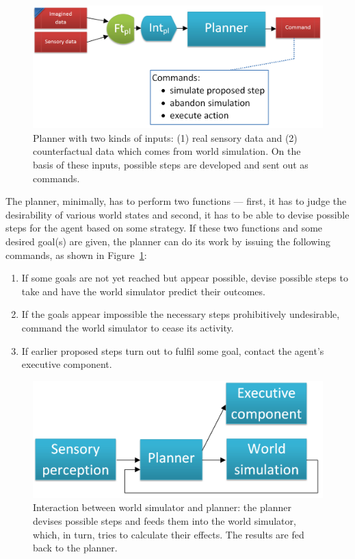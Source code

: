 \documentclass[]{scrartcl}
\theoremstyle{break}
\begin{document}
\begin{figure}
	\centering
	\includegraphics[width=\textwidth]{figs/planner.png}
	\caption{Planner with two kinds of inputs: (1) real sensory data and (2) counterfactual data which comes from world simulation. On the basis of these inputs, possible steps are developed and sent out as commands.}
	\label{fig:planner}
\end{figure}

The planner, minimally, has to perform two functions --- first, it has to judge the desirability of various world states and second, it has to be able to devise possible steps for the agent based on some strategy. If these two functions and some desired goal(s) are given, the planner can do its work by issuing the following commands, as shown in Figure~\ref{fig:planner}:
\begin{enumerate}
	\item If some goals are not yet reached but appear possible, devise possible steps to take and have the world simulator predict their outcomes.
	\item If the goals appear impossible the necessary steps prohibitively undesirable, command the world simulator to cease its activity.
	\item If earlier proposed steps turn out to fulfil some goal, contact the agent's executive component.
\end{enumerate}

\begin{figure}
	\centering
	\includegraphics[width=\textwidth]{figs/worldSimulatorPlannerInteraction.png}
	\caption{Interaction between world simulator and planner: the planner devises possible steps and feeds them into the world simulator, which, in turn, tries to calculate their effects. The results are fed back to the planner.}
	\label{fig:worldSimulatorPlannerInteraction}
\end{figure}
\end{document}
